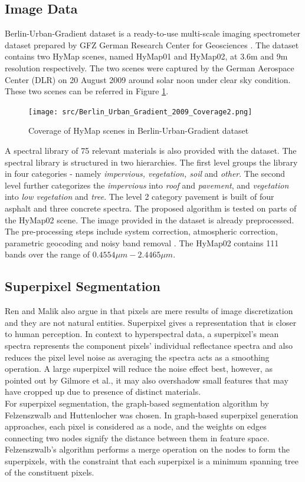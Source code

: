 \documentclass[12pt,twoside]{article}
\theoremstyle{plain}
\theoremstyle{definition}
\theoremstyle{remark}
\begin{document}
\subsection{Image Data}
Berlin-Urban-Gradient dataset is a ready-to-use multi-scale imaging spectrometer dataset prepared by GFZ German Research Center for Geosciences \cite{okujeni2016berlinurbangradient}. The dataset contains two HyMap scenes, named HyMap01 and HyMap02, at 3.6m and 9m resolution respectively. The two scenes were captured by the German Aerospace Center (DLR) on 20 August 2009 around solar noon under clear sky condition. These two scenes can be referred in Figure \ref{fig:data}.\\
\begin{figure}
\texttt{[image: src/Berlin\_Urban\_Gradient\_2009\_Coverage2.png]}
\caption{Coverage of HyMap scenes in Berlin-Urban-Gradient dataset \cite{okujeni2016berlinurbangradient}}
\label{fig:data}
\end{figure}
A spectral library of 75 relevant materials is also provided with the dataset. The spectral library is structured in two hierarchies. The first level groups the library in four categories - namely \textit{impervious, vegetation, soil} and \textit{other}. The second level further categorizes the \textit{impervious} into \textit{roof} and \textit{pavement}, and \textit{vegetation} into \textit{low vegetation} and \textit{tree}. The level 2 category pavement is built of four asphalt and three concrete spectra. The proposed algorithm is tested on parts of the HyMap02 scene. The image provided in the dataset is already preprocessed. The pre-processing steps include system correction, atmospheric correction, parametric geocoding and noisy band removal \cite{okujeni2016berlinurbangradient}. The HyMap02 contains 111 bands over the range of $0.4554\mu m - 2.4465\mu m$.

\subsection{Superpixel Segmentation}
Ren and Malik also argue in \cite{ren2003learning} that pixels are mere results of image discretization and they are not natural entities. Superpixel gives a representation that is closer to human perception. In context to hyperspectral data, a superpixel's mean spectra represents the component pixels' individual reflectance spectra and also reduces the pixel level noise as averaging the spectra acts as a smoothing operation. A large superpixel will reduce the noise effect best, however, as pointed out by Gilmore et al.\cite{gilmore2011superpixel}, it may also overshadow small features that may have cropped up due to presence of distinct materials.\\
For superpixel segmentation, the graph-based segmentation algorithm by Felzenszwalb and Huttenlocher \cite{felzenszwalb2004efficient} was chosen. In graph-based superpixel generation approaches, each pixel is considered as a node, and the weights on edges connecting two nodes signify the distance between them in feature space. Felzenszwalb's algorithm performs a merge operation on the nodes to form the superpixels, with the constraint that each superpixel is a minimum spanning tree of the constituent pixels.
\end{document}
